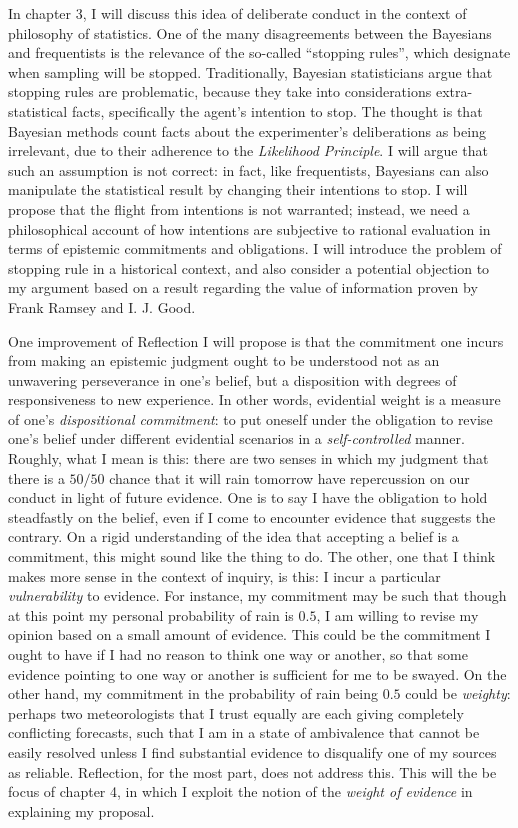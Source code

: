 In chapter 3, I will discuss this idea of deliberate conduct in the
context of philosophy of statistics. One of the many disagreements
between the Bayesians and frequentists is the relevance of the so-called
``stopping rules'', which designate when sampling will be stopped.
Traditionally, Bayesian statisticians argue that stopping rules are
problematic, because they take into considerations extra-statistical
facts, specifically the agent's intention to stop. The thought is
that Bayesian methods count facts about the
experimenter's deliberations as being irrelevant, due to their adherence to the \emph{Likelihood
Principle}. I will argue that such an assumption is not correct: in
fact, like frequentists, Bayesians can also manipulate the statistical
result by changing their intentions to stop. I will propose that the
flight from intentions is not warranted; instead, we need a
philosophical account of how intentions are subjective to rational
evaluation in terms of epistemic commitments and obligations. I will
introduce the problem of stopping rule in a historical context, and also consider a potential
objection to my argument based on a result regarding the value of
information proven by Frank Ramsey and I. J. Good.

One improvement of Reflection I will propose is that the commitment one
incurs from making an epistemic judgment ought to be understood not as
an unwavering perseverance in one's belief, but a disposition with
degrees of responsiveness to new experience. In other words, evidential
weight is a measure of one's \emph{dispositional commitment}: to put
oneself under the obligation to revise one's belief under different
evidential scenarios in a \emph{self-controlled} manner. Roughly, what I
mean is this: there are two senses in which my judgment that there is
a \(50/50\) chance that it will rain tomorrow have repercussion on our conduct in light of future evidence. One
is to say I have the obligation to hold steadfastly on the belief, even
if I come to encounter evidence that suggests the contrary. On a rigid
understanding of the idea that accepting a belief is a commitment, this
might sound like the thing to do. The other, one that I think makes more
sense in the context of inquiry, is this: I incur a particular
\emph{vulnerability} to evidence. For instance, my commitment may be
such that though at this point my personal probability of rain is
\(0.5\), I am willing to revise my opinion based on a small amount of
evidence. This could be the commitment I ought to have if I had no reason to
think one way or another, so that some evidence pointing to one way or
another is sufficient for me to be swayed. On the other hand, my
commitment in the probability of rain being \(0.5\) could be
\emph{weighty}: perhaps two meteorologists that I trust equally are each
giving completely conflicting forecasts, such that I am in a state of
ambivalence that cannot be easily resolved unless I find substantial
evidence to disqualify one of my sources as reliable. Reflection, for
the most part, does not address this. This will the be focus of chapter
4, in which I exploit the notion of the \emph{weight of evidence} in
explaining my proposal.

